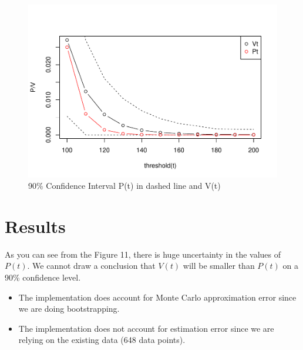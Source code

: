 \documentclass[11pt,]{article}
\providecommand{\tightlist}{%
\setlength{\itemsep}{0pt}\setlength{\parskip}{0pt}}
\begin{document}
\begin{figure}
\centering
\includegraphics{figs/unnamed-chunk-32.pdf}
\caption{90\% Confidence Interval P(t) in dashed line and V(t)}
\end{figure}

\hypertarget{results}{%
\section{Results}\label{results}}

As you can see from the Figure 11, there is huge uncertainty in the
values of \(P(t)\). We cannot draw a conclusion that \(V(t)\) will be
smaller than \(P(t)\) on a 90\% confidence level.

\begin{itemize}
\tightlist
\item
  The implementation does account for Monte Carlo approximation error
  since we are doing bootstrapping.
\item
  The implementation does not account for estimation error since we are
  relying on the existing data (648 data points).
\end{itemize}





\newpage
\singlespacing 

\end{document}
